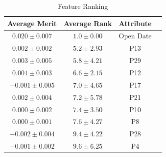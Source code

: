 \documentclass[10pt, oneside]{article}   	%
\begin{document}
\begin{table}[htdp]
\caption{Feature Ranking}
\begin{center}
\begin{tabular}{|c|c|c|c|}
\hline
Average Merit   &   Average Rank         & Attribute \\ \hline
$ 0.020 \pm 0.007$ &  $   1.0 \pm 0.00 $ & Open Date \\ \hline
$ 0.002 \pm 0.002$ &  $   5.2 \pm 2.93 $ & P13 \\ \hline
$ 0.003 \pm 0.005$ &  $   5.8 \pm 4.21 $ & P29 \\ \hline
$ 0.001 \pm 0.003$ &  $   6.6 \pm 2.15 $ & P12 \\ \hline
$-0.001 \pm 0.005$ &  $   7.0 \pm 4.65 $ & P17 \\ \hline
$ 0.002 \pm 0.004$ &  $   7.2 \pm 5.78 $ & P21 \\ \hline
$ 0.000 \pm 0.002$ &  $   7.4 \pm 3.50 $ & P10 \\ \hline
$ 0.000 \pm 0.001$ &  $   7.6 \pm 4.27 $ & P8 \\ \hline
$-0.002 \pm 0.004$ &  $   9.4 \pm 4.22 $ & P28 \\ \hline
$-0.001 \pm 0.002$ &  $   9.6 \pm 6.25 $ & P4 \\ \hline
\end{tabular}
\end{center}
\label{tab:feature_ranking}
\end{table}%
\end{document}
